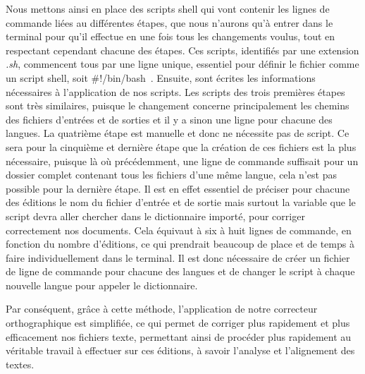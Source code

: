 Nous mettons ainsi en place des scripts shell qui vont contenir les lignes de commande liées au différentes étapes, que nous n'aurons qu'à entrer dans le terminal pour qu'il effectue en une fois tous les changements voulus, tout en respectant cependant chacune des étapes. Ces scripts, identifiés par une extension \emph{.sh}, commencent tous par une ligne unique, essentiel pour définir le fichier comme un script shell, soit \og\#!/bin/bash~\fg{}. Ensuite, sont écrites les informations nécessaires à l'application de nos scripts. Les scripts des trois premières étapes sont très similaires, puisque le changement concerne principalement les chemins des fichiers d'entrées et de sorties et il y a sinon une ligne pour chacune des langues. La quatrième étape est manuelle et donc ne nécessite pas de script. Ce sera pour la cinquième et dernière étape que la création de ces fichiers est la plus nécessaire, puisque là où précédemment, une ligne de commande suffisait pour un dossier complet contenant tous les fichiers d'une même langue, cela n'est pas possible pour la dernière étape. Il est en effet essentiel de préciser pour chacune des éditions le nom du fichier d'entrée et de sortie mais surtout la variable que le script devra aller chercher dans le dictionnaire importé, pour corriger correctement nos documents. Cela équivaut à six à huit lignes de commande, en fonction du nombre d'éditions, ce qui prendrait beaucoup de place et de temps à faire individuellement dans le terminal. Il est donc nécessaire de créer un fichier de ligne de commande pour chacune des langues et de changer le script à chaque nouvelle langue pour appeler le dictionnaire.

Par conséquent, grâce à cette méthode, l'application de notre correcteur orthographique est simplifiée, ce qui permet de corriger plus rapidement et plus efficacement nos fichiers texte, permettant ainsi de procéder plus rapidement au véritable travail à effectuer sur ces éditions, à savoir l'analyse et l'alignement des textes.